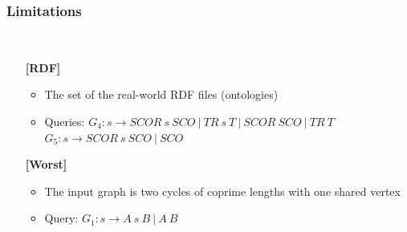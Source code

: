 \documentclass[xcolor=table]{beamer}
\begin{document}
\begin{frame}[fragile] \frametitle{Limitations}
  \begin{minipage}[t]{1cm}
\hspace{1cm}
  \end{minipage}
  ~
\begin{minipage}[t]{0.85\textwidth}
\begin{itemize}
\item[\textbf{[RDF]}]
\begin{itemize}
  \item The set of the real-world RDF files (ontologies)
  \item Queries: $G_4: s \to SCOR \ s \ SCO \ | \ TR \ s \ T \ | \ SCOR \ SCO \ | \ TR \ T$
$G_5: s \to SCOR \ s \ SCO \ | \ SCO$
\end{itemize}

\pause
\item[\textbf{[Worst]}]
\begin{itemize}
  \item The input graph is two cycles of coprime lengths with one shared vertex
  \begin{figure}
\end{figure}
  \item Query: $G_1: s \to A \ s \ B \ | \ A \ B$
\end{itemize}
\end{itemize}
\end{minipage}
\end{frame}
\end{document}
